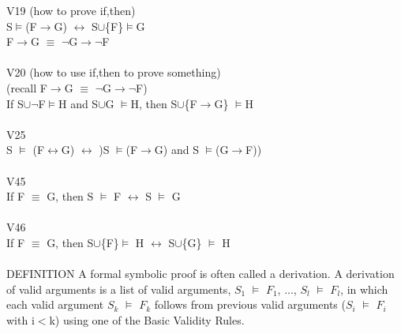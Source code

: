 \documentclass[10pt,letter]{article}
\begin{document}
V19 (how to prove if,then)\\ 
S$\models$(F$\rightarrow$G) $\longleftrightarrow$ S$\cup$\{F\}$\models$G\\
F$\rightarrow$G $\equiv$ $\neg$G$\rightarrow\neg$F\\\\

V20 (how to use if,then to prove something)\\
(recall F$\rightarrow$G $\equiv$ $\neg$G$\rightarrow\neg$F)\\
If S$\cup\neg$F$\models$H and S$\cup$G $\models$H, then S$\cup$\{F$\rightarrow$G\} $\models$H\\\\

V25\\
S $\models$ (F$\leftrightarrow$G) $\longleftrightarrow$ )S $\models$(F$\rightarrow$G) and S $\models$(G$\rightarrow$F))\\\\

V45\\
If F $\equiv$ G, then S $\models$ F $\longleftrightarrow$ S $\models$ G\\\\
V46\\
If F $\equiv$ G, then S$\cup$\{F\}$\models$ H $\longleftrightarrow$ S$\cup$\{G\} $\models$ H\\\\

DEFINITION
A formal symbolic proof is often called a derivation. A derivation of valid arguments is a list of valid arguments, $S_1$ $\models$ $F_1$, ..., $S_l$ $\models$ $F_l$, in which each valid argument $S_k$ $\models$ $F_k$ follows from previous valid arguments ($S_i$ $\models$ $F_i$ with i$<$k) using one of the Basic Validity Rules.
\end{document}
